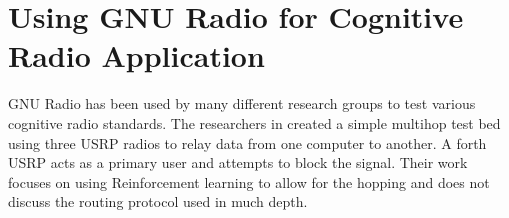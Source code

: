 \section{Using GNU Radio for Cognitive Radio Application}

GNU Radio has been used by many different research groups to test various cognitive radio
standards. The researchers in \cite{7141228} created a simple multihop test bed using
three USRP radios to relay data from one computer to another. A forth USRP acts as a primary
user and attempts to block the signal. Their work focuses on using Reinforcement learning to allow
for the hopping and does not discuss the routing protocol used in much depth. 
